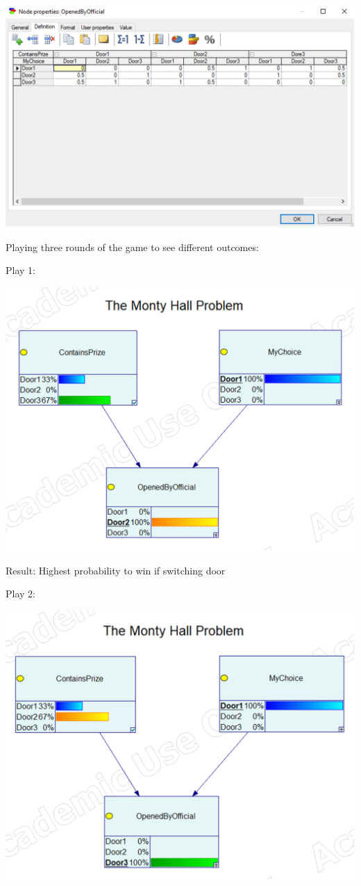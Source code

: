 \documentclass{article}
\begin{document}
\includegraphics[width=\linewidth]{openedbyofficial.png}


Playing three rounds of the game to see different outcomes:

Play 1:

\includegraphics[width=\linewidth]{play1.png}


Result: Highest probability to win if switching door

Play 2:

\includegraphics[width=\linewidth]{play2.png}
\end{document}
